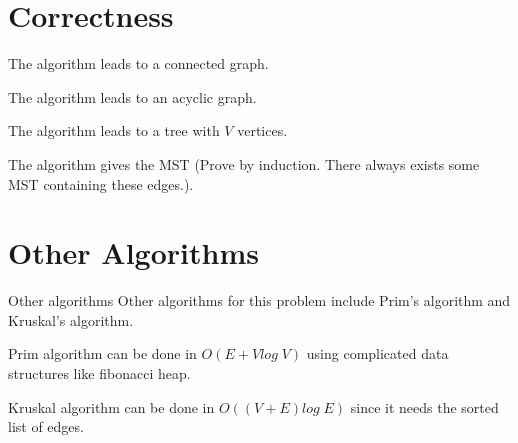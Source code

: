 \documentclass[
	11pt, %
]{beamer}
\begin{document}
\section{Correctness}
\begin{frame}
    \tableofcontentscurrent
\end{frame}

\begin{frame}
    \begin{lemma}
        The algorithm leads to a connected graph.
    \end{lemma}
    
    \begin{lemma}
        The algorithm leads to an acyclic graph.
    \end{lemma}
    
    \begin{fact}
        The algorithm leads to a tree with $V$ vertices.
    \end{fact}

    \begin{lemma}
        The algorithm gives the MST (Prove by induction. There always exists some MST containing these edges.).
    \end{lemma}
\end{frame}

\section{Other Algorithms}
\begin{frame}
    \tableofcontentscurrent
\end{frame}

\begin{frame}
    \begin{beamerboxesrounded}[shadow=true]{Other algorithms}
        Other algorithms for this problem include Prim's algorithm and Kruskal's algorithm.
    \end{beamerboxesrounded}

    \begin{fact}
        Prim algorithm can be done in $O(E + V log \; V)$ using complicated data structures like fibonacci heap.
    \end{fact}

    \begin{fact}
        Kruskal algorithm can be done in $O((V + E) log \; E)$ since it needs the sorted list of edges.
    \end{fact}
\end{frame}
\end{document}
